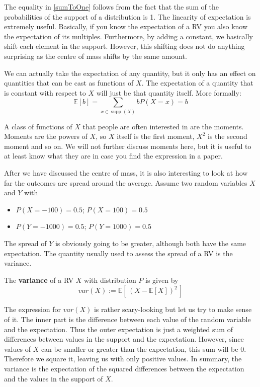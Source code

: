 \documentclass[a4paper,11pt,leqno]{report}
\newcommand{\supp}{\operatorname{supp}}
\newcommand{\E}{\mathbb{E}}
\begin{document}
The equality in \eqref{sumToOne} follows from the fact that the sum of the probabilities of the support of a distribution is 1.
The linearity of expectation is extremely useful. Basically, if you know the expectation of a RV you also know the 
expectation of its multiples. Furthermore, by adding a constant, we basically shift each element in the support. However, this shifting
does not do anything surprising as the centre of mass shifts by the same amount.

We can actually take the expectation of any quantity, but it only has an effect on quantities that
can be cast as functions of $ X $. The expectation of a quantity that is constant with respect to $ X $ will just be that
quantity itself. More formally:
\begin{equation}
\E[b] = \sum_{x \in \supp(X)} b P(X=x) = b
\end{equation}

A class of functions of $ X $ that people are often interested in are
the moments. Moments are the powers of $ X $, so $ X $ itself is the
first moment, $ X^{2} $ is the second moment and so on. We will not
further discuss moments here, but it is useful to at least know what
they are in case you find the expression in a paper.

\medskip
After we have discussed the centre of mass, it is also interesting to look at how far the outcomes are spread around the average. Assume two random variables $ X $ and $ Y $ with
\begin{itemize}
\item $ P(X=-100) = 0.5 $; $ P(X=100) = 0.5 $
\item $ P(Y=-1000) = 0.5 $; $ P(Y=1000) = 0.5 $
\end{itemize}
The spread of $ Y $ is obviously going to be greater, although both have the same expectation. The quantity usually used to assess
the spread of a RV is the variance.

\begin{Definition}
The \textbf{variance} of a RV $ X $ with distribution $ P $ is given by
$$ var(X) := \E[\, (X - \E[X])^{2} \, ] $$
\end{Definition}

The expression for $ var(X) $ is rather scary-looking but let us try to make sense of it. The inner part is the difference between
each value of the random variable and the expectation. Thus the outer expectation is just a weighted sum of differences between 
values in the support and the expectation. However, since values of $ X $ can be smaller or greater than the expectation, this
sum will be 0. Therefore we square it, leaving us with only positive values. In summary, the variance is the expectation
of the squared differences between the expectation and the values in the support of $ X $.
\end{document}
